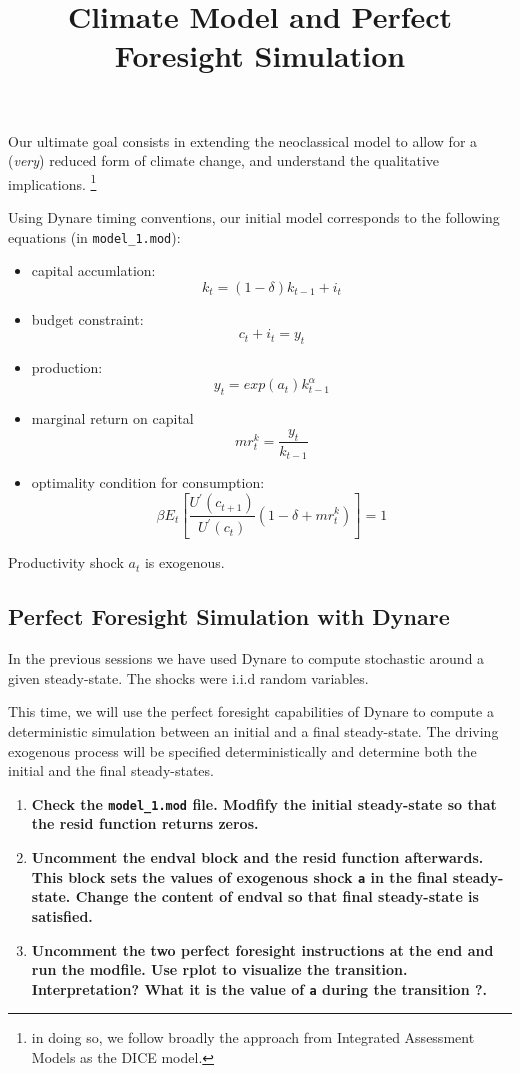 \documentclass[
  letterpaper,
  DIV=11,
  numbers=noendperiod]{scrartcl}
\title{Climate Model and Perfect Foresight Simulation}
\author{}
\date{}
\providecommand{\tightlist}{%
  \setlength{\itemsep}{0pt}\setlength{\parskip}{0pt}}\usepackage{longtable,booktabs,array}
\begin{document}
\maketitle

Our ultimate goal consists in extending the neoclassical model to allow
for a (\emph{very}) reduced form of climate change, and understand the
qualitative implications. \footnote{in doing so, we follow broadly the
  approach from Integrated Assessment Models as the DICE model.}

Using Dynare timing conventions, our initial model corresponds to the
following equations (in \texttt{model\_1.mod}):

\begin{itemize}
\tightlist
\item
  capital accumlation: \[k_t = (1-\delta) k_{t-1} + i_t\]
\item
  budget constraint: \[c_t + i_t = y_t\]
\item
  production: \[y_t = exp(a_t)k_{t-1}^{\alpha}\]
\item
  marginal return on capital \[{mr}^k_t = \frac{y_t}{k_{t-1}}\]
\item
  optimality condition for consumption:
  \[\beta E_t \left[ \frac{U^{\prime}(c_{t+1})}{U^{\prime}(c_t)} (1-\delta + {mr}^k_t  )\right] = 1\]
\end{itemize}

Productivity shock \(a_t\) is exogenous.

\subsection{Perfect Foresight Simulation with
Dynare}\label{perfect-foresight-simulation-with-dynare}

In the previous sessions we have used Dynare to compute stochastic
around a given steady-state. The shocks were i.i.d random variables.

This time, we will use the perfect foresight capabilities of Dynare to
compute a deterministic simulation between an initial and a final
steady-state. The driving exogenous process will be specified
deterministically and determine both the initial and the final
steady-states.

\begin{enumerate}
\def\labelenumi{\arabic{enumi}.}
\item
  \textbf{Check the \texttt{model\_1.mod} file. Modfify the initial
  steady-state so that the resid function returns zeros.}
\item
  \textbf{Uncomment the endval block and the resid function afterwards.
  This block sets the values of exogenous shock \texttt{a} in the final
  steady-state. Change the content of endval so that final steady-state
  is satisfied.}
\item
  \textbf{Uncomment the two perfect foresight instructions at the end
  and run the modfile. Use rplot to visualize the transition.
  Interpretation? What it is the value of \texttt{a} during the
  transition ?.}
\end{enumerate}
\end{document}
